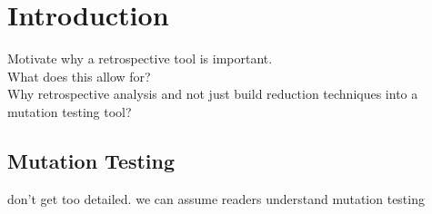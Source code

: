 \section{Introduction}
Motivate why a retrospective tool is important. \\
What does this allow for?\\
Why retrospective analysis and not just build reduction techniques into a mutation testing tool?\\

\subsection{Mutation Testing}
don't get too detailed. we can assume readers understand mutation testing

%
%

